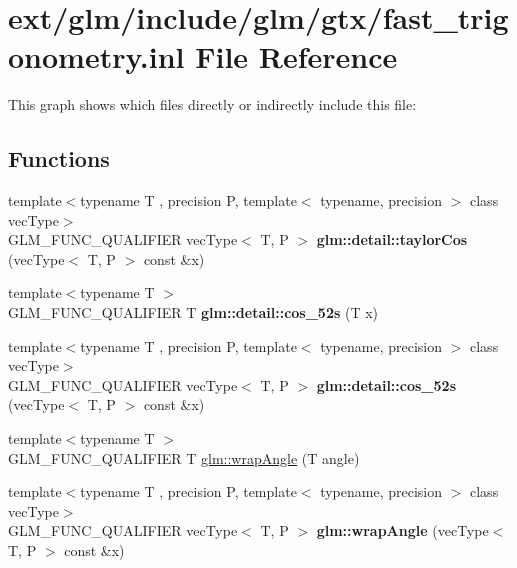 \hypertarget{fast__trigonometry_8inl}{\section{ext/glm/include/glm/gtx/fast\-\_\-trigonometry.inl File Reference}
\label{fast__trigonometry_8inl}
}
This graph shows which files directly or indirectly include this file\-:
\subsection*{Functions}
\begin{DoxyCompactItemize}
\item 
\hypertarget{namespaceglm_1_1detail_a4a16281a64def18b20ab307b516095c2}{{\footnotesize template$<$typename T , precision P, template$<$ typename, precision $>$ class vec\-Type$>$ }\\G\-L\-M\-\_\-\-F\-U\-N\-C\-\_\-\-Q\-U\-A\-L\-I\-F\-I\-E\-R vec\-Type$<$ T, P $>$ {\bfseries glm\-::detail\-::taylor\-Cos} (vec\-Type$<$ T, P $>$ const \&x)}\label{namespaceglm_1_1detail_a4a16281a64def18b20ab307b516095c2}

\item 
\hypertarget{namespaceglm_1_1detail_a09055f8d723109dc95c8cc2309e20acc}{{\footnotesize template$<$typename T $>$ }\\G\-L\-M\-\_\-\-F\-U\-N\-C\-\_\-\-Q\-U\-A\-L\-I\-F\-I\-E\-R T {\bfseries glm\-::detail\-::cos\-\_\-52s} (T x)}\label{namespaceglm_1_1detail_a09055f8d723109dc95c8cc2309e20acc}

\item 
\hypertarget{namespaceglm_1_1detail_ad0c49f46dc1033d16811b2b90f1dcc64}{{\footnotesize template$<$typename T , precision P, template$<$ typename, precision $>$ class vec\-Type$>$ }\\G\-L\-M\-\_\-\-F\-U\-N\-C\-\_\-\-Q\-U\-A\-L\-I\-F\-I\-E\-R vec\-Type$<$ T, P $>$ {\bfseries glm\-::detail\-::cos\-\_\-52s} (vec\-Type$<$ T, P $>$ const \&x)}\label{namespaceglm_1_1detail_ad0c49f46dc1033d16811b2b90f1dcc64}

\item 
{\footnotesize template$<$typename T $>$ }\\G\-L\-M\-\_\-\-F\-U\-N\-C\-\_\-\-Q\-U\-A\-L\-I\-F\-I\-E\-R T \hyperlink{group__gtx__fast__trigonometry_ga069527c6dbd64f53435b8ebc4878b473}{glm\-::wrap\-Angle} (T angle)
\item 
\hypertarget{namespaceglm_a643ff6d35f2ea3652029cf4197ca900e}{{\footnotesize template$<$typename T , precision P, template$<$ typename, precision $>$ class vec\-Type$>$ }\\G\-L\-M\-\_\-\-F\-U\-N\-C\-\_\-\-Q\-U\-A\-L\-I\-F\-I\-E\-R vec\-Type$<$ T, P $>$ {\bfseries glm\-::wrap\-Angle} (vec\-Type$<$ T, P $>$ const \&x)}\label{namespaceglm_a643ff6d35f2ea3652029cf4197ca900e}


\end{DoxyCompactItemize}
